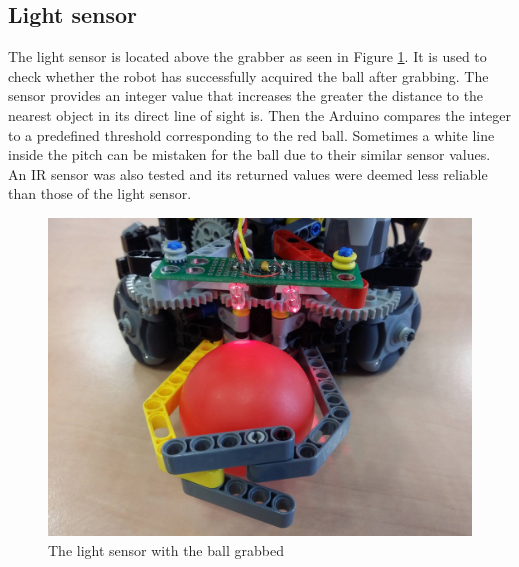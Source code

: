\documentclass[a4paper,12pt]{article}
\begin{document}
\subsection{Light sensor}

The light sensor is located above the grabber as seen in Figure \ref{fig:sensor}. It is used to check whether
the robot has successfully acquired the ball after grabbing. The sensor
provides an integer value that increases the greater the distance to the
nearest object in its direct line of sight is. Then the Arduino compares the integer
to a predefined threshold corresponding to the red ball. Sometimes a white
line inside the pitch can be mistaken for the ball due to their similar sensor
values. An IR sensor was also tested and its returned values were deemed less reliable than
those of the light sensor.

\begin{figure}[ht!]
\centering
\includegraphics[scale=.1]{sensor1}
\caption{The light sensor with the ball grabbed}
\label{fig:sensor}
\end{figure}
\end{document}
